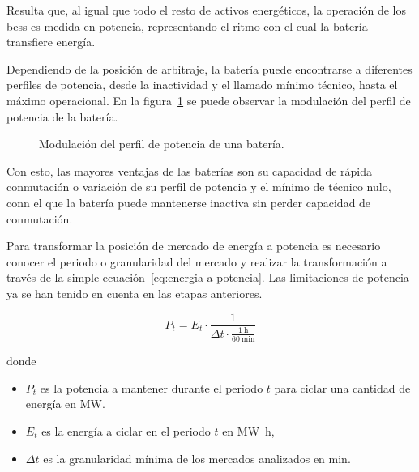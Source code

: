 Resulta que, al igual que todo el resto de activos energéticos, la operación de los \gls{bess} es medida en potencia, representando el ritmo con el cual la batería transfiere energía.

Dependiendo de la posición de arbitraje, la batería puede encontrarse a diferentes perfiles de potencia, desde la inactividad y el llamado mínimo técnico, hasta el máximo operacional. En la figura~\ref{fig:perfil-potencia} se puede observar la modulación del perfil de potencia de la batería.

\begin{figure}
  \centering
  \caption{Modulación del perfil de potencia de una batería.}
  \label{fig:perfil-potencia}
\end{figure}

Con esto, las mayores ventajas de las baterías son su capacidad de rápida conmutación o variación de su perfil de potencia y el mínimo de técnico nulo, conn el que la batería puede mantenerse inactiva sin perder capacidad de conmutación.

Para transformar la posición de mercado de energía a potencia es necesario conocer el periodo o granularidad del mercado y realizar la transformación a través de la simple ecuación~\ref{eq:energia-a-potencia}. Las limitaciones de potencia ya se han tenido en cuenta en las etapas anteriores.

\begin{samepage}

  \begin{equation}
    \label{eq:energia-a-potencia}
    P_{t} = E_{t} \cdot \frac{1}{\Delta t \cdot \frac{\SI{1}{\hour}}{\SI{60}{\minute}}}
  \end{equation}

  donde

  \begin{itemize}

    \item \( P_{t} \) es la potencia a mantener durante el periodo \( t \) para ciclar una cantidad de energía en \si{\mega\watt}.

    \item \( E_{t} \) es la energía a ciclar en el periodo \( t \) en \si{{\mega\watt\hour}},

    \item \( \Delta t \) es la granularidad mínima de los mercados analizados en \si{\minute}.

  \end{itemize}

\end{samepage}

